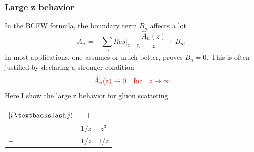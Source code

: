 \documentclass{beamer}
\begin{document}
\begin{frame}
    \frametitle{Large z behavior}
    In the BCFW formula, the boundary term $B_n$ affects a lot
    \begin{equation*}
        A_n=-\sum_{z_I}Res|_{z=z_I}\frac{\hat{A}_n(z)}{z}+B_n,
    \end{equation*}
    In most applications. one assumes or much better, proves $B_n=0$. This is often justified by declaring a stronger condition
    \begin{equation*}
        \textcolor{red}{\hat{A}_n(z)\rightarrow 0 \quad \text{for} \quad z\rightarrow \infty} 
    \end{equation*}
    Here I show the large z behavior for gluon scattering 
    \begin{center}
        \begin{tabular}{lrc}
            \toprule
            $[i\, \textbackslash \, j\rangle $ & $+$ & $-$ \\
            \midrule
            $+$ & $1/z$ & $z^3$ \\
            $-$ & $1/z$ & $1/z$ \\
            \bottomrule
          \end{tabular}
    \end{center}
    
      
\end{frame}
\end{document}
